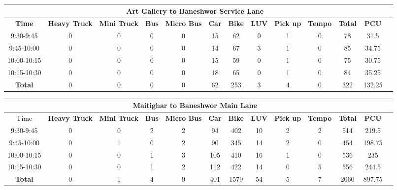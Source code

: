 \begin{landscape}
\centering
\begin{table}[h!]
\centering
\begin{tabular}{|c|c|c|c|c|c|c|c|c|c|c|c|c|}
    \hline
    \multicolumn{12}{|c|}{\textbf{Art Gallery to Baneshwor Service Lane}} \\
    \hline
    \textbf{Time} & \textbf{Heavy Truck} & \textbf{Mini Truck} & \textbf{Bus} & \textbf{Micro Bus} & \textbf{Car} & \textbf{Bike} & \textbf{LUV} & \textbf{Pick up} & \textbf{Tempo} & \textbf{\textbf{Total}} & \textbf{PCU} \\
    \hline
9:30-9:45	&0	&0	&0	&0	&15	&62	&0	&1	&0	&78	&31.5 \\ \hline
9:45-10:00	&0	&0	&0	&0	&14	&67	&3	&1	&0	&85	&34.75 \\ \hline
10:00-10:15	&0	&0	&0	&0	&15	&59	&0	&1	&0	&75	&30.75 \\ \hline
10:15-10:30	&0	&0	&0	&0	&18	&65	&0	&1	&0	&84	&35.25 \\ \hline
\textbf{Total}	&0	&0	&0	&0 &62 &253 &3 &4 &0 &322 &132.25 \\ \hline



\end{tabular}

\vspace{0.5cm}

\begin{tabular}{|c|c|c|c|c|c|c|c|c|c|c|c|c|}
    \hline
    \multicolumn{12}{|c|}{\textbf{Maitighar to Baneshwor Main Lane}} \\
    \hline
        Time & \textbf{Heavy Truck} & \textbf{Mini Truck} & \textbf{Bus} & \textbf{Micro Bus} & \textbf{Car} & \textbf{Bike} & \textbf{LUV} & \textbf{Pick up} & \textbf{Tempo} & \textbf{\textbf{Total}} & \textbf{PCU} \\
    \hline
9:30-9:45	&0	&0	&2	&2	&94	&402	&10	&2	&2	&514	&219.5 \\ \hline
9:45-10:00	&0	&1	&0	&2	&90	&345	&14	&2	&0	&454	&198.75 \\ \hline
10:00-10:15	&0	&0	&1	&3	&105	&410	&16	&1	&0	&536	&235 \\ \hline
10:15-10:30	&0	&0	&1	&2	&112	&422	&14	&0	&5	&556	&244.5 \\ \hline
\textbf{Total} & 0 & 1 & 4 & 9 & 401 & 1579 & 54 & 5 & 7 & 2060 & 897.75 \\ \hline



\end{tabular}


\end{table}
\end{landscape}
